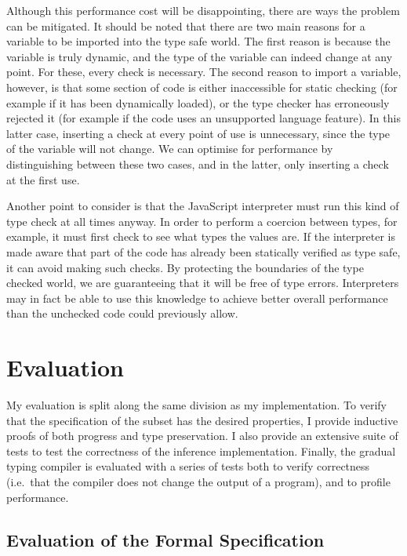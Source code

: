 \documentclass[12pt,a4paper,twoside,openright]{report}
\theoremstyle{definition}
\theoremstyle{dotless}
\begin{document}
Although this performance cost will be disappointing, there are ways the
problem can be mitigated. It should be noted that there are two main reasons
for a variable to be imported into the type safe world. The first reason is
because the variable is truly dynamic, and the type of the variable can indeed
change at any point. For these, every check is necessary. The second reason to
import a variable, however, is that some section of code is either inaccessible
for static checking (for example if it has been dynamically loaded), or the
type checker has erroneously rejected it (for example if the code uses an
unsupported language feature). In this latter case, inserting a check at every
point of use is unnecessary, since the type of the variable will not change. We
can optimise for performance by distinguishing between these two cases, and in
the latter, only inserting a check at the first use.

Another point to consider is that the JavaScript interpreter must run this kind
of type check at all times anyway. In order to perform a coercion between
types, for example, it must first check to see what types the values are. If
the interpreter is made aware that part of the code has already been statically
verified as type safe, it can avoid making such checks. By protecting the
boundaries of the type checked world, we are guaranteeing that it will be free
of type errors. Interpreters may in fact be able to use this knowledge to
achieve better overall performance than the unchecked code could previously
allow.

\chapter{Evaluation}\label{evaluation}

My evaluation is split along the same division as my implementation. To verify
that the specification of the subset has the desired properties, I provide
inductive proofs of both progress and type preservation.  I also provide an
extensive suite of tests to test the correctness of the inference
implementation. Finally, the gradual typing compiler is evaluated with a series
of tests both to verify correctness (i.e.~that the compiler does not change the
output of a program), and to profile performance.

\section{Evaluation of the Formal Specification}
\end{document}
